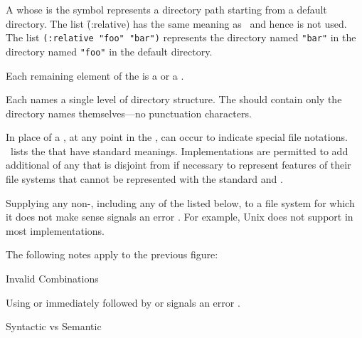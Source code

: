 \item{}

  A  whose  is the symbol  represents 
  a directory path starting from a default directory.  
  The list \f{(:relative)} has the same meaning as \nil\ and hence is not used.
  The list {\tt (:relative "foo" "bar")} represents the directory named {\tt "bar"} 
  in the directory named {\tt "foo"} in the default directory.

\endlist

Each remaining element of the  is a  or a .

Each  names a single level of directory structure.
The  should contain only the directory names 
themselves---no punctuation characters.

In place of a , at any point in the ,  
can occur to indicate special file notations.
\Thenextfigure\ lists the  that have standard meanings.
Implementations are permitted to add additional  
of any  that is disjoint from 
if necessary to represent features of their file systems that cannot be
represented with the standard  and .

Supplying any non-, including any of the  listed below, 
to a file system for which it does not make sense
signals an error .
For example, Unix does not support  in most implementations.
 
%

The following notes apply to the previous figure:

\beginlist
\item{Invalid Combinations}

Using  or  
immediately followed by  or 
signals an error .
 
\item{Syntactic vs Semantic}

